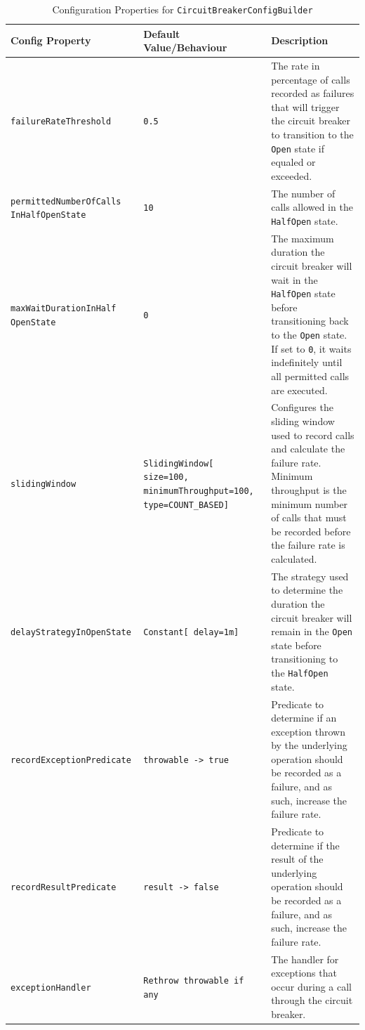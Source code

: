 \begin{table}[!htb]
    \centering
    \caption{Configuration Properties for \texttt{CircuitBreakerConfigBuilder}}
    \label{tab:cbreaker-config-builder}
    \vspace{0.3cm}
    \begin{tabular}{|p{5cm}|p{5cm}|p{6cm}|}
        \hline
        \textbf{Config Property}          & \textbf{Default Value/Behaviour} & \textbf{Description}                                                                                                                                        \\ \hline
        \texttt{failureRateThreshold}     & \texttt{0.5}                     & The rate in percentage of calls recorded as failures that will trigger the circuit breaker to transition to the \texttt{Open} state if equaled or exceeded. \\ \hline
        \texttt{permittedNumberOfCalls InHalfOpenState} & \texttt{10} & The number of calls
        allowed in the \texttt{HalfOpen} state. \\ \hline
        \texttt{maxWaitDurationInHalf OpenState} & \texttt{0} & The maximum duration
        the circuit breaker will wait in the \texttt{HalfOpen} state before transitioning back to the \texttt{Open} state.
        If set to \texttt{0}, it waits indefinitely until all permitted calls are executed. \\ \hline
        \texttt{slidingWindow} & \texttt{SlidingWindow[ size=100, minimumThroughput=100, type=COUNT\_BASED]}
        & Configures the sliding window used to record calls and calculate the failure rate.
        Minimum throughput is the minimum number of calls
        that must be recorded before the failure rate is calculated.
        \\ \hline
        \texttt{delayStrategyInOpenState} & \texttt{Constant[ delay=1m]}     & The strategy used to determine the duration the circuit breaker will remain in the \texttt{Open} state before transitioning to the \texttt{HalfOpen} state. \\ \hline
        \texttt{recordExceptionPredicate} & \texttt{throwable ->
            true} & Predicate
        to determine if an exception thrown by the underlying operation should be recorded as a failure, and as such, increase the failure rate. \\ \hline
        \texttt{recordResultPredicate} & \texttt{result ->
            false} & Predicate
        to determine if the result of the underlying operation should be recorded as a failure, and as such, increase the failure rate. \\ \hline
        \texttt{exceptionHandler} & \texttt{Rethrow throwable
        if any} & The handler for exceptions that occur during a call through the circuit breaker. \\ \hline
    \end{tabular}
\end{table}

